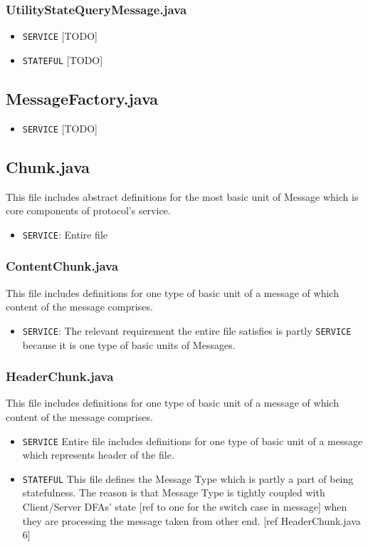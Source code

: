 \documentclass[12pt]{usenixsubmit}
\begin{document}
     \subsubsection{UtilityStateQueryMessage.java}
     \begin{itemize}
     \item {\tt SERVICE} [TODO]
     \item {\tt STATEFUL} [TODO]
     \end{itemize} 
     
    \subsection{MessageFactory.java}
     \begin{itemize}
     \item {\tt SERVICE} [TODO]
     \end{itemize}
     
     \subsection{Chunk.java} This file includes abstract definitions for the most basic unit of Message which is core components of protocol's service.
     \begin{itemize}
     \item {\tt SERVICE}: Entire file 
     \end{itemize}

    \subsubsection{ContentChunk.java}This file includes definitions for one type of basic unit of a message of which content of the message comprises.
    \begin{itemize}
     \item {\tt SERVICE}: The relevant requirement the entire file satisfies is partly {\tt SERVICE} because it is one type of basic units of Messages.
     \end{itemize}

    \subsubsection{HeaderChunk.java}This file includes definitions for one type of basic unit of a message of which content of the message comprises.
    \begin{itemize}
    \item {\tt SERVICE} Entire file includes definitions for one type of basic unit of a message which represents header of the file.
      \item {\tt STATEFUL} This file defines the Message Type  which is partly a part of being statefulness. The reason is that Message Type is tightly coupled with Client/Server DFAs' state [ref to one for the switch case in message] when they are processing the message taken from other end. [ref HeaderChunk.java 6]
     \end{itemize}   
\end{document}
